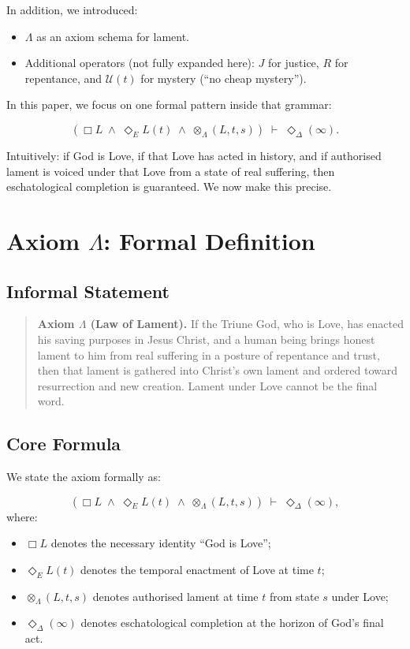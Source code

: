 \documentclass[11pt]{article}
\begin{document}
In addition, we introduced:
\begin{itemize}
  \item $\Lambda$ as an axiom schema for lament.
  \item Additional operators (not fully expanded here): $J$ for justice, $R$ for repentance, and $\mathcal{U}(t)$ for mystery (``no cheap mystery'').
\end{itemize}

In this paper, we focus on one formal pattern inside that grammar:

\begin{equation}
  (\Box L \;\land\; \Diamond_E L(t) \;\land\; \otimes_{\Lambda}(L, t, s))
  \;\vdash\;
  \Diamond_{\Delta}(\infty).
  \label{eq:axiom-lambda-intro}
\end{equation}

Intuitively: if God is Love, if that Love has acted in history, and if authorised lament is voiced under that Love from a state of real suffering, then eschatological completion is guaranteed. We now make this precise.

\section{Axiom $\Lambda$: Formal Definition}

\subsection{Informal Statement}

\begin{quote}
  \textbf{Axiom $\Lambda$ (Law of Lament).} If the Triune God, who is Love, has enacted his saving purposes in Jesus Christ, and a human being brings honest lament to him from real suffering in a posture of repentance and trust, then that lament is gathered into Christ's own lament and ordered toward resurrection and new creation. Lament under Love cannot be the final word.
\end{quote}

\subsection{Core Formula}

We state the axiom formally as:

\begin{equation}
  (\Box L \;\land\; \Diamond_E L(t) \;\land\; \otimes_{\Lambda}(L, t, s))
  \;\vdash\;
  \Diamond_{\Delta}(\infty),
  \label{eq:axiom-lambda-core}
\end{equation}
where:
\begin{itemize}
  \item $\Box L$ denotes the necessary identity ``God is Love'';
  \item $\Diamond_E L(t)$ denotes the temporal enactment of Love at time $t$;
  \item $\otimes_{\Lambda}(L, t, s)$ denotes authorised lament at time $t$ from state $s$ under Love;
  \item $\Diamond_{\Delta}(\infty)$ denotes eschatological completion at the horizon of God's final act.
\end{itemize}
\end{document}
